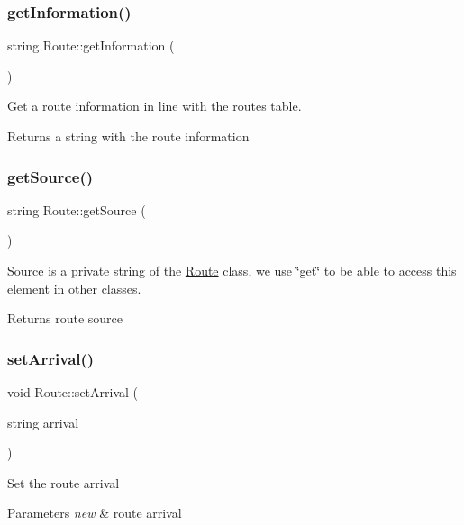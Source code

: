 \subsubsection{\texorpdfstring{get\+Information()}{getInformation()}}
{\footnotesize\ttfamily string Route\+::get\+Information (\begin{DoxyParamCaption}{ }\end{DoxyParamCaption})}

Get a route information in line with the routes table. \begin{DoxyReturn}{Returns}
a string with the route information 
\end{DoxyReturn}
\hypertarget{classRoute_aded296bd92c4eadb9d2c64d2e5088220}{}\label{classRoute_aded296bd92c4eadb9d2c64d2e5088220} 
\subsubsection{\texorpdfstring{get\+Source()}{getSource()}}
{\footnotesize\ttfamily string Route\+::get\+Source (\begin{DoxyParamCaption}{ }\end{DoxyParamCaption})}

Source is a private string of the \hyperlink{classRoute}{Route} class, we use \char`\"{}get\char`\"{} to be able to access this element in other classes. \begin{DoxyReturn}{Returns}
route source 
\end{DoxyReturn}
\hypertarget{classRoute_ad020607979b427d768f3c0f1f9600fb3}{}\label{classRoute_ad020607979b427d768f3c0f1f9600fb3} 
\subsubsection{\texorpdfstring{set\+Arrival()}{setArrival()}}
{\footnotesize\ttfamily void Route\+::set\+Arrival (\begin{DoxyParamCaption}\item[{string}]{arrival }\end{DoxyParamCaption})}

Set the route arrival 
\begin{DoxyParams}{Parameters}
{\em new} & route arrival \\
\hline
\end{DoxyParams}
\hypertarget{classRoute_a9bd5ad9f9bc229585f183a114c1709e1}{}\label{classRoute_a9bd5ad9f9bc229585f183a114c1709e1} 
